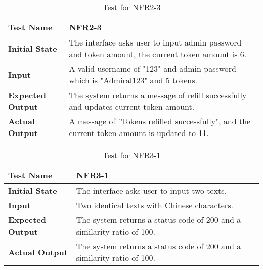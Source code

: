 \documentclass[12pt, titlepage]{article}
\begin{document}
		\begin{table}[H]
			
			\begin{tabular}[r]{|l|p{10cm}|}
				
				\hline
				
				\textbf{Test Name} & NFR2-3 \\ 
				\hline
				\textbf{Initial State} & The interface asks user to input admin password and token amount, the current token amount is 6.\\ 
				\hline
				\textbf{Input} & A valid username of "123" and admin password which is "Admiral123" and 5 tokens. \\ 
				\hline 
				\textbf{Expected Output} & The system returns a message of refill successfully and updates current token amount. \\ 
				\hline
				\textbf{Actual Output} & A message of "Tokens refilled successfully", and the current token amount is updated to 11.  \\ 
				\hline
				
			\end{tabular}
			\caption{Test for NFR2-3}
			\label{Table}
		\end{table}
		
		\begin{table}[H]
			
			\begin{tabular}[r]{|l|p{10cm}|}
				
				\hline
				
				\textbf{Test Name} & NFR3-1 \\ 
				\hline
				\textbf{Initial State} & The interface asks user to input two texts.\\ 
				\hline
				\textbf{Input} & Two identical texts with Chinese characters. \\ 
				\hline 
				\textbf{Expected Output} & The system returns a status code of 200 and a similarity ratio of 100.  \\ 
				\hline
				\textbf{Actual Output} & The system returns a status code of 200 and a similarity ratio of 100.  \\ 
				\hline
				
			\end{tabular}
			\caption{Test for NFR3-1}
			\label{Table}
		\end{table}
		
\end{document}
